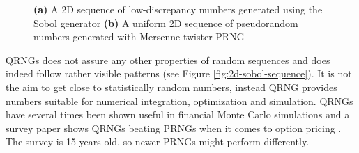 \begin{figure}
  \centering

  \caption{\textbf{(a)} A 2D sequence of low-discrepancy numbers
    generated using the Sobol generator \textbf{(b)} A uniform 2D
    sequence of pseudorandom numbers generated with Mersenne twister
    PRNG}
\label{fig:discrepancyplot}
\end{figure}

QRNGs does not assure any other properties of random sequences and
does indeed follow rather visible patterns (see Figure
\ref{fig:2d-sobol-sequence}). It is not the aim to get close to
statistically random numbers, instead QRNG provides numbers suitable
for numerical integration, optimization and simulation. QRNGs have
several times been shown useful in financial Monte Carlo simulations
\cite{chaudhary2005american, couffignals2010quasi, dfine2009americanbasket}
and a survey paper shows QRNGs beating PRNGs
when it comes to option pricing \cite{acworth1998comparison}. The
survey is 15 years old, so newer PRNGs might perform differently.

